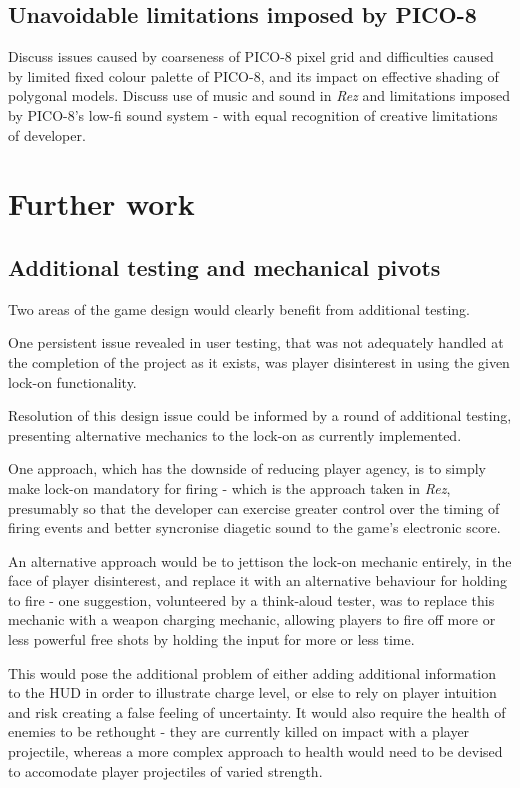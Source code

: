 \documentclass[11pt]{article}
\begin{document}
\subsection{Unavoidable limitations imposed by PICO-8}
Discuss issues caused by coarseness of PICO-8 pixel grid and difficulties caused by
limited fixed colour palette of PICO-8, and its impact on effective shading of polygonal
models. Discuss use of music and sound in \textit{Rez} and limitations imposed by PICO-8's
low-fi sound system - with equal recognition of creative limitations of developer.


\section{Further work}

\subsection{Additional testing and mechanical pivots}

Two areas of the game design would clearly benefit from additional testing.

One persistent issue revealed in user testing, that was not adequately handled at the completion of
the project as it exists, was player disinterest in using the given lock-on functionality.

Resolution of this design issue could be informed by a round of additional testing, presenting
alternative mechanics to the lock-on as currently implemented.

One approach, which has the downside
of reducing player agency, is to simply make lock-on mandatory for firing - which is the approach
taken in \textit{Rez}, presumably so that the developer can exercise greater control over the timing
of firing events and better syncronise diagetic sound to the game's electronic score.

An alternative approach would be to jettison the lock-on mechanic entirely, in the face of
player disinterest, and replace it with an alternative behaviour for holding to fire - one
suggestion, volunteered by a think-aloud tester, was to replace this mechanic with a weapon
charging mechanic, allowing players to fire off more or less powerful free shots by holding
the input for more or less time.

This would pose the additional problem of either adding
additional information to the HUD in order to illustrate charge level, or else to rely on
player intuition and risk creating a false feeling of uncertainty. It would also require
the health of enemies to be rethought - they are currently killed on impact with
a player projectile, whereas a more complex approach to health would need to be devised
to accomodate player projectiles of varied strength.
\end{document}
